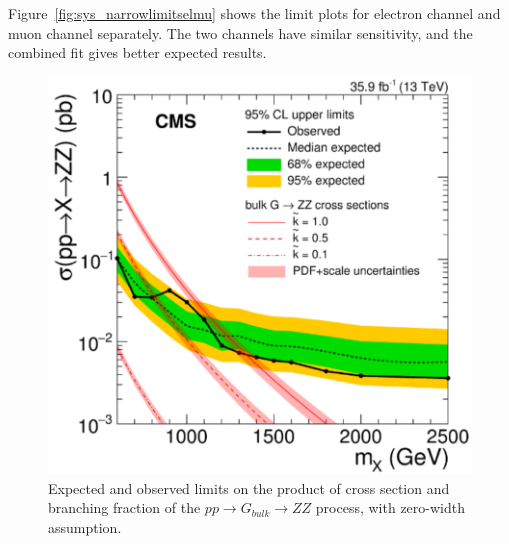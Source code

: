 \vspace{0.3cm}
Figure~\ref{fig:sys_narrowlimitselmu} shows the limit plots for electron channel and muon channel separately. The two channels have similar sensitivity, and the combined fit gives better expected results.


\begin{figure}[htbp]
\begin{center}
\includegraphics[width=0.9\linewidth]{figures/sys_narrowlimit.png}
\caption{Expected and observed limits on the product of cross section and branching fraction of the $pp\rightarrow G_{bulk}\rightarrow ZZ$ process, with zero-width assumption.}
\label{fig:sys_narrowlimits}
\end{center}
\end{figure}

